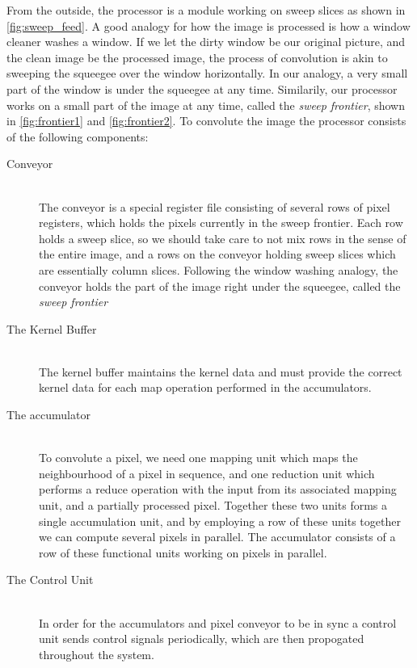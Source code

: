 From the outside, the processor is a module working on sweep slices as shown in \ref{fig:sweep_feed}.
A good analogy for how the image is processed is how a window cleaner washes a window.
If we let the dirty window be our original picture, and the clean image be the processed image, the process of convolution is akin to sweeping the squeegee over the window horizontally.
In our analogy, a very small part of the window is under the squeegee at any time.
Similarily, our processor works on a small part of the image at any time, called the \textit{sweep frontier}, shown in \ref{fig:frontier1} and \ref{fig:frontier2}.
To convolute the image the processor consists of the following components:

\begin{description}
    \item[Conveyor] \hfill\\ 
        The conveyor is a special register file consisting of several rows of pixel registers, which holds the pixels currently in the sweep frontier.
        Each row holds a sweep slice, so we should take care to not mix rows in the sense of the entire image, and a rows on the conveyor holding sweep slices which are essentially column slices.
        Following the window washing analogy, the conveyor holds the part of the image right under the squeegee, called the \textit{sweep frontier}
    \item[The Kernel Buffer] \hfill\\
        The kernel buffer maintains the kernel data and must provide the correct kernel data for each map operation performed in the accumulators.
    \item[The accumulator] \hfill\\
        To convolute a pixel, we need one mapping unit which maps the neighbourhood of a pixel in sequence, and one reduction unit which performs a reduce operation with the input from its associated mapping unit, and a partially processed pixel.
        Together these two units forms a single accumulation unit, and by employing a row of these units together we can compute several pixels in parallel.
        The accumulator consists of a row of these functional units working on pixels in parallel.
    \item[The Control Unit] \hfill\\
        In order for the accumulators and pixel conveyor to be in sync a control unit sends control signals periodically, which are then propogated throughout the system.
\end{description}

